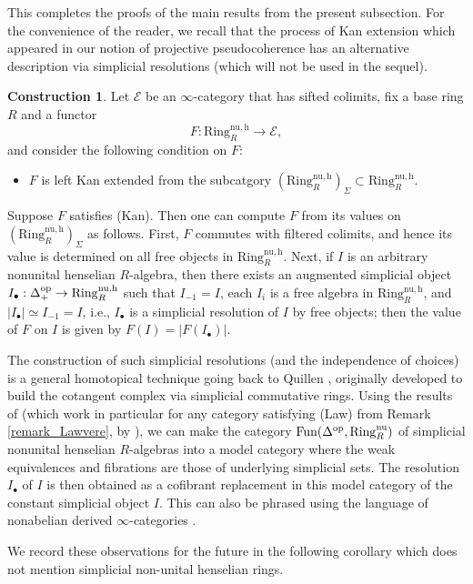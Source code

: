 \documentclass{amsart}
\newcommand{\fun}{\mathrm{Fun}}
\theoremstyle{definition}
\newtheorem{cons}[definition]{Construction}
\newcommand{\sub}[1]{{\mbox{\rm \scriptsize #1}}}
\newcommand{\nur}{\mathrm{Ring}^{\mathrm{nu}}_R}
\newcommand{\nuh}{\mathrm{Ring}^{\mathrm{nu,h}}_R}
\begin{document}
This completes the proofs of the main results from the present subsection. 
For the convenience of the reader, we recall that  the process
of Kan extension which appeared in our notion of projective pseudocoherence has an alternative description via simplicial resolutions
(which will not be used in the sequel). 
\begin{cons}
\label{kanextsifted}
Let $\mathcal{E}$ be an $\infty$-category that has sifted colimits, fix a base ring $R$ and a functor
\[ F: \nuh \to \mathcal{E},  \] and
consider the following condition on $F$:

\begin{itemize}
\item[(Kan)] $F$ is left Kan extended from the subcatgory $(\nuh)_\Sigma \subset \nuh$. 
\end{itemize}

Suppose $F$ satisfies (Kan). Then one can compute $F$ from its values on $(\nuh)_\Sigma$ as
follows. First, $F$ commutes with filtered colimits, and hence its value is
determined on all free objects in $\nuh$.  Next, if $I$ is an arbitrary
nonunital henselian $R$-algebra, then there exists  an augmented simplicial
object $I_\bullet:\Delta^\sub{op}_+ \to \nuh$ such that $I_{-1} = I$,
each $I_i$ is a free algebra in 
$\nuh$, and 
$|I_\bullet| \simeq I_{-1} = I$, i.e., $I_\bullet$ is a simplicial resolution
of $I$ by free objects; then the value of $F$ on $I$ is given by $F(I) = |F(I_\bullet)|$. 

The construction of such simplicial 
resolutions (and the independence of choices) is a general homotopical technique
going back to Quillen \cite{QuillenHA}, originally developed to build the cotangent
complex via simplicial commutative rings. Using the results of
\cite{QuillenHA} (which work in particular for any category satisfying (Law)
from Remark \ref{remark_Lawvere}, by \cite[Rmk.~1, pg.~II.4.2]{QuillenHA}), we
can make the category $\fun( \Delta^\sub{op}, \nur)$ of simplicial  nonunital henselian $R$-algebras into a model category where the weak equivalences and fibrations are those of underlying simplicial sets.  The resolution $I_\bullet$  of $I$ is then obtained as a cofibrant replacement in this model category of the constant simplicial object $I$.
This can also be 
phrased
using the language of nonabelian derived $\infty$-categories
\cite[Sec.~5.5.8]{HTT}. 

We record these observations for the future in the following corollary 
which does not mention simplicial non-unital henselian rings. 


\end{cons}
\end{document}

